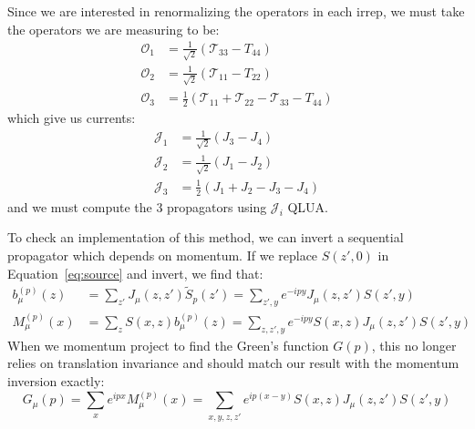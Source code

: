 \documentclass[11pt, oneside]{article}   	%
\theoremstyle{definition}
\begin{document}
Since we are interested in renormalizing the operators in each irrep, we must take the operators we are measuring to be:
\begin{align}
	\mathcal O_1 &= \frac{1}{\sqrt{2}}\left(\mathcal T_{33} - T_{44}\right) \\
	\mathcal O_2 &= \frac{1}{\sqrt{2}}\left(\mathcal T_{11} - T_{22}\right) \\
	\mathcal O_3 &= \frac{1}{2}\left(\mathcal T_{11} + \mathcal T_{22} - \mathcal T_{33} - T_{44}\right)
\end{align}
which give us currents:
\begin{align}
	\mathcal J_1 &= \frac{1}{\sqrt{2}}(J_3 - J_4) \\
	\mathcal J_2 &= \frac{1}{\sqrt 2} (J_1 - J_2) \\
	\mathcal J_3 &= \frac{1}{2} (J_1 + J_2 - J_3 - J_4)
\end{align}
and we must compute the 3 propagators using $\mathcal J_i$ QLUA. 

To check an implementation of this method, we can invert a sequential propagator which depends on momentum. If we 
replace $S(z', 0)$ in Equation~\ref{eq:source} and invert, we find that:
\begin{align}
	b_\mu^{(p)}(z) &= \sum_{z'} J_\mu(z, z') \tilde S_p(z') = \sum_{z', y} e^{-ipy} J_\mu(z, z') S(z', y) \\
	M_\mu^{(p)}(x) &= \sum_{z} S(x, z) b_\mu^{(p)}(z) = \sum_{z, z', y} e^{-ipy} S(x, z) J_\mu(z, z') S(z', y)
\end{align}
When we momentum project to find the Green's function $G(p)$, this no longer relies on translation invariance and should 
match our result with the momentum inversion exactly:
\begin{equation}
	G_\mu(p) = \sum_x e^{ipx} M_\mu^{(p)}(x) = \sum_{x, y, z, z'} e^{ip(x - y)} S(x, z) J_\mu(z, z') S(z', y)
\end{equation}
\end{document}
